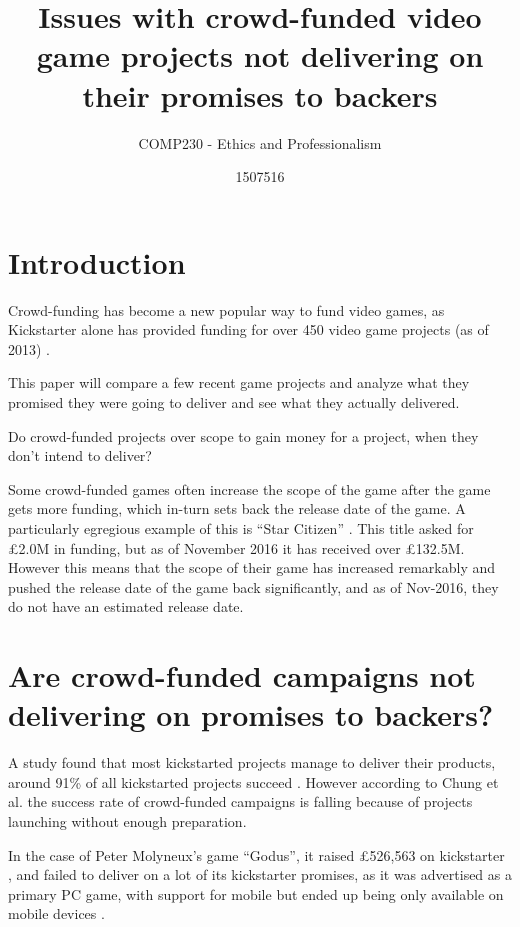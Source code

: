 \documentclass{scrartcl}
\title{Issues with crowd-funded video game projects not delivering on their promises to backers} %
\subtitle{COMP230 - Ethics and Professionalism}
\author{1507516}
\begin{document}
\maketitle


\section{Introduction}
Crowd-funding has become a new popular way to fund video games\cite{xu2014show}, as Kickstarter alone has provided funding for over 450 video game projects (as of 2013) \cite{Harris:2013}. %

This paper will compare a few recent game projects and analyze what they promised they were going to deliver and see what they actually delivered.

Do crowd-funded projects over scope to gain money for a project, when they don't intend to deliver?


Some crowd-funded games often increase the scope of the game after the game gets more funding, which in-turn sets back the release date of the game. A particularly egregious example of this is ``Star Citizen'' \cite{kickstarterStarCitizen}. This title asked for \pounds2.0M in funding, but as of November 2016 it has received over \pounds132.5M. However this means that the scope of their game has increased remarkably and pushed the release date of the game back significantly, and as of Nov-2016, they do not have an estimated release date.

\section{Are crowd-funded campaigns not delivering on promises to backers?}

A study found that most kickstarted projects manage to deliver their products, around 91\% of all kickstarted projects succeed \cite{mollick2015}. However according to Chung et al. \cite{Chung:2015} the success rate of crowd-funded campaigns is falling because of projects launching without enough preparation.

In the case of Peter Molyneux's game ``Godus'', it raised \pounds526,563 on kickstarter \cite{GodusKickstarter}, and failed to deliver on a lot of its kickstarter promises, as it was advertised as a primary PC game, with support for mobile but ended up being only available on mobile devices \cite{GodusFailure}.
\end{document}
